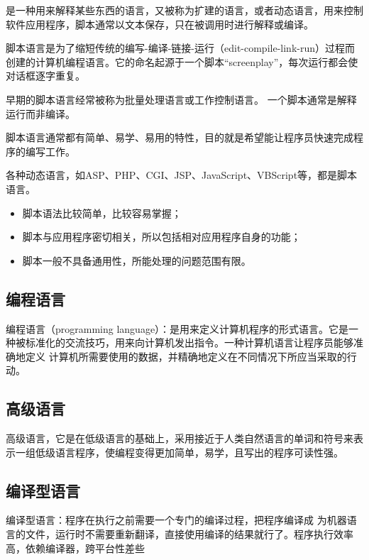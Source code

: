 是一种用来解释某些东西的语言，又被称为扩建的语言，或者动态语言，用来控制软件应用程序，脚本通常以文本保存，只在被调用时进行解释或编译。

脚本语言是为了缩短传统的编写-编译-链接-运行（edit-compile-link-run）过程而创建的计算机编程语言。它的命名起源于一个脚本“screenplay”，每次运行都会使对话框逐字重复。

早期的脚本语言经常被称为批量处理语言或工作控制语言。 一个脚本通常是解释运行而非编译。

脚本语言通常都有简单、易学、易用的特性，目的就是希望能让程序员快速完成程序的编写工作。

各种动态语言，如ASP、PHP、CGI、JSP、JavaScript、VBScript等，都是脚本语言。

\begin{itemize}
\item 脚本语法比较简单，比较容易掌握；

\item 脚本与应用程序密切相关，所以包括相对应用程序自身的功能；

\item 脚本一般不具备通用性，所能处理的问题范围有限。
\end{itemize}

\subsection{编程语言}\label{CpLgg_sub5}

编程语言（programming language）：是用来定义计算机程序的形式语言。它是一种被标准化的交流技巧，用来向计算机发出指令。一种计算机语言让程序员能够准确地定义
计算机所需要使用的数据，并精确地定义在不同情况下所应当采取的行动。

\subsection{高级语言}\label{CpLgg_sub6}

高级语言，它是在低级语言的基础上，采用接近于人类自然语言的单词和符号来表示一组低级语言程序，使编程变得更加简单，易学，且写出的程序可读性强。

\subsection{编译型语言}\label{CpLgg_sub7}

编译型语言：程序在执行之前需要一个专门的编译过程，把程序编译成 为机器语言的文件，运行时不需要重新翻译，直接使用编译的结果就行了。程序执行效率高，依赖编译器，跨平台性差些
